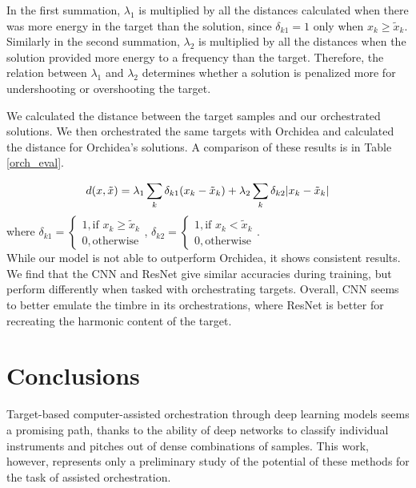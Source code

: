 \documentclass{article}
\begin{document}
In the first summation, $\lambda_1$ is multiplied by all the distances calculated when there was more energy in the target than the solution, since $\delta_{k1} = 1$ only when $x_k \ge \tilde{x}_k$. Similarly in the second summation, $\lambda_2$ is multiplied by all the distances when the solution provided more energy to a frequency than the target. Therefore, the relation between $\lambda_1$ and $\lambda_2$ determines whether a solution is penalized more for undershooting or overshooting the target.

We calculated the distance between the target samples and our orchestrated solutions. We then orchestrated the same targets with Orchidea and calculated the distance for Orchidea's solutions. A comparison of these results is in Table \ref{orch_eval}.

\begin{equation}\label{distance}
d(x, \tilde{x}) =\lambda_1 \sum_k \delta_{k1}(x_k - \tilde{x}_k) + \lambda_2 \sum_k \delta_{k2}|x_k - \tilde{x	}_k| \\
\end{equation}
where 
$
\delta_{k1} = 
\begin{cases}
1, \text{if   } x_k \ge \tilde{x}_k \\
0, \text{otherwise}
\end{cases} 
$, $
\delta_{k2} = 
\begin{cases}
1, \text{if   } x_k < \tilde{x}_k \\
0, \text{otherwise}
\end{cases}.
$\\

While our model is not able to outperform Orchidea, it shows consistent results. We find that the CNN and ResNet give similar accuracies during training, but perform differently when tasked with orchestrating targets. Overall, CNN seems to better emulate the timbre in its orchestrations, where ResNet is better for recreating the harmonic content of the target. 

\section{Conclusions}
\label{sec:conclusions}

Target-based computer-assisted orchestration through deep learning models seems a promising path, thanks to the ability of deep networks to classify individual instruments and pitches out of dense combinations of samples. This work, however, represents only a preliminary study of the potential of these methods for the task of assisted orchestration. 
\end{document}
